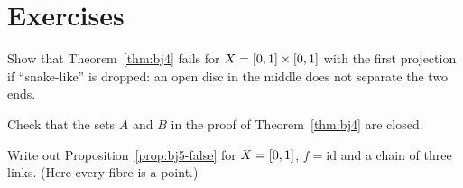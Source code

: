 
\section*{Exercises}

\begin{exercise}
Show that Theorem~\ref{thm:bj4} fails for $X=[0,1]\times[0,1]$ with the first projection if ``snake-like'' is dropped: an open disc in the middle does not separate the
two ends.
\end{exercise}

\begin{exercise}
Check that the sets $A$ and $B$ in the proof of Theorem~\ref{thm:bj4} are closed.
\end{exercise}

\begin{exercise}
Write out Proposition~\ref{prop:bj5-false} for $X=[0,1]$, $f=\mathrm{id}$ and a chain of three links. (Here every fibre is a point.)
\end{exercise}
